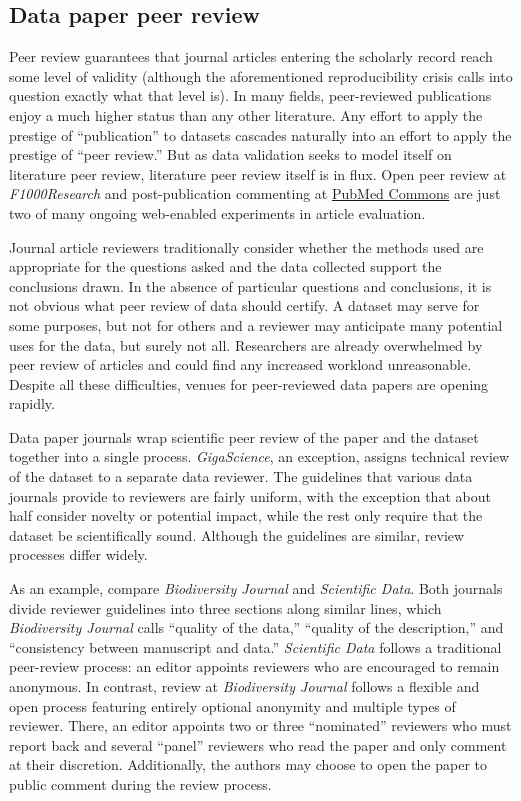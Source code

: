 \documentclass[10pt,a4paper,twocolumn]{article}
\begin{document}
{{\subsection*{Data paper peer review}\label{data-paper-peer-review}

Peer review guarantees that journal articles entering the scholarly record reach some level of validity (although the aforementioned reproducibility crisis calls into question exactly what that level is).
In many fields, peer-reviewed publications enjoy a much higher status than any other literature.
Any effort to apply the prestige of ``publication'' to datasets cascades naturally into an effort to apply the prestige of ``peer review.''
But as data validation seeks to model itself on literature peer review, literature peer review itself is in flux\cite{pulverer_transparent_2010, herron_is_2012, kriegeskorte_emerging_2012}.
Open peer review at \emph{F1000Research} and post-publication commenting at \href{http://www.ncbi.nlm.nih.gov/pubmedcommons/}{PubMed Commons} are just two of many ongoing web-enabled experiments in article evaluation.

Journal article reviewers traditionally consider whether the methods used are appropriate for the questions asked and the data collected support the conclusions drawn.
In the absence of particular questions and conclusions, it is not obvious what peer review of data should certify.
A dataset may serve for some purposes, but not for others and a reviewer may anticipate many potential uses for the data, but surely not all\cite{parsons_data_2010}.
Researchers are already overwhelmed by peer review of articles\cite{diederich_are_2013} and could find any increased workload unreasonable.
Despite all these difficulties, venues for peer-reviewed data papers are opening rapidly.

Data paper journals wrap scientific peer review of the paper and the dataset together into a single process. 
\emph{GigaScience}, an exception, assigns technical review of the dataset to a separate data reviewer.
The guidelines that various data journals provide to reviewers are fairly uniform, with the exception that about half consider novelty or potential impact, while the rest only require that the dataset be scientifically sound.
Although the guidelines are similar, review processes differ widely. 

As an example, compare \emph{Biodiversity Journal} and \emph{Scientific Data}.
Both journals divide reviewer guidelines into three sections along similar lines, which \emph{Biodiversity Journal} calls ``quality of the data,'' ``quality of the description,'' and ``consistency between manuscript and data.''
\emph{Scientific Data} follows a traditional peer-review process: an editor appoints reviewers who are encouraged to remain anonymous.
In contrast, review at \emph{Biodiversity Journal} follows a flexible and open process featuring entirely optional anonymity and multiple types of reviewer.
There, an editor appoints two or three ``nominated'' reviewers who must report back and several ``panel'' reviewers who read the paper and only comment at their discretion.
Additionally, the authors may choose to open the paper to public comment during the review process.

}}
\end{document}
